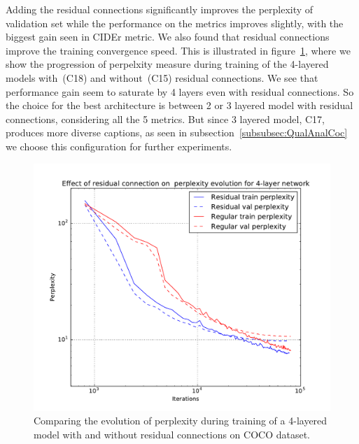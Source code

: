Adding the residual connections significantly improves the perplexity of
validation set while the performance on the metrics improves slightly, with the
biggest gain seen in CIDEr metric.
We also found that residual connections improve the training convergence speed.
This is illustrated in figure~\ref{fig:MetVsPerplex}, where we show the
progression of perpelxity measure during training of the 4-layered models
with~(C18) and without~(C15) residual connections.
We see that performance gain seem to saturate by 4 layers even with residual
connections.
So the choice for the best architecture is between 2 or 3 layered model with
residual connections, considering all the 5 metrics.
But since 3 layered model, C17, produces more diverse captions, as seen in
subsection~\ref{subsubsec:QualAnalCoc} we choose this configuration for further
experiments.
\begin{figure}[t]
\begin{center}
  \includegraphics[width=0.7\linewidth]{images/ResidualVsRegPerplex.pdf}
\end{center}
\vspace*{-10mm}
\caption{Comparing the evolution of perplexity during training of a 4-layered
        model with and without residual connections on COCO dataset.}
\label{fig:MetVsPerplex}
\end{figure}

